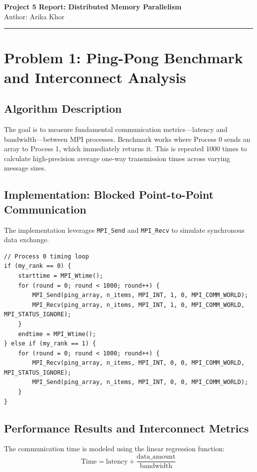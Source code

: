 \documentclass[11pt]{article}
\begin{document}
\begin{center}
    {\Large \textbf{\color{white}Project 5 Report: Distributed Memory Parallelism}}\\
    \vspace{0.5em}
    Author: Arika Khor
\end{center}

\vspace{1em}

\noindent\rule{\textwidth}{0.4pt}

\section*{\color{white}Problem 1: Ping-Pong Benchmark and Interconnect Analysis}

\subsection*{Algorithm Description}
The goal is to measure fundamental communication metrics—latency and bandwidth—between MPI processes. Benchmark works where Process 0 sends an array to Process 1, which immediately returns it. This is repeated 1000 times to calculate high-precision average one-way transmission times across varying message sizes.

\subsection*{Implementation: Blocked Point-to-Point Communication}
The implementation leverages \texttt{MPI\_Send} and \texttt{MPI\_Recv} to simulate synchronous data exchange.

\begin{lstlisting}
// Process 0 timing loop
if (my_rank == 0) {
    starttime = MPI_Wtime();
    for (round = 0; round < 1000; round++) {
        MPI_Send(ping_array, n_items, MPI_INT, 1, 0, MPI_COMM_WORLD);
        MPI_Recv(ping_array, n_items, MPI_INT, 1, 0, MPI_COMM_WORLD, MPI_STATUS_IGNORE);
    }
    endtime = MPI_Wtime();
} else if (my_rank == 1) {
    for (round = 0; round < 1000; round++) {
        MPI_Recv(ping_array, n_items, MPI_INT, 0, 0, MPI_COMM_WORLD, MPI_STATUS_IGNORE);
        MPI_Send(ping_array, n_items, MPI_INT, 0, 0, MPI_COMM_WORLD);
    }
}
\end{lstlisting}

\subsection*{Performance Results and Interconnect Metrics}
The communication time is modeled using the linear regression function:
\begin{equation*}
\text{Time} = \text{latency} + \frac{\text{data\_amount}}{\text{bandwidth}}
\end{equation*}
\end{document}
